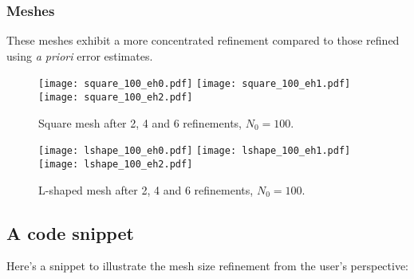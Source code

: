 \newpage
\subsubsection{Meshes}

These meshes exhibit a more concentrated refinement compared to those refined using \textit{a priori} error estimates.

\begin{figure}[!ht]
	\centering
	\texttt{[image: square\_100\_eh0.pdf]}
    \texttt{[image: square\_100\_eh1.pdf]}
    \texttt{[image: square\_100\_eh2.pdf]}
	\caption{Square mesh after 2, 4 and 6 refinements, $N_0 = 100$.}
\end{figure}

\begin{figure}[!ht]
	\centering
	\texttt{[image: lshape\_100\_eh0.pdf]}
    \texttt{[image: lshape\_100\_eh1.pdf]}
    \texttt{[image: lshape\_100\_eh2.pdf]}
	\caption{L-shaped mesh after 2, 4 and 6 refinements, $N_0 = 100$.}
\end{figure}

\newpage
\subsection{A code snippet}

Here's a snippet to illustrate the mesh size refinement from the user's perspective:


